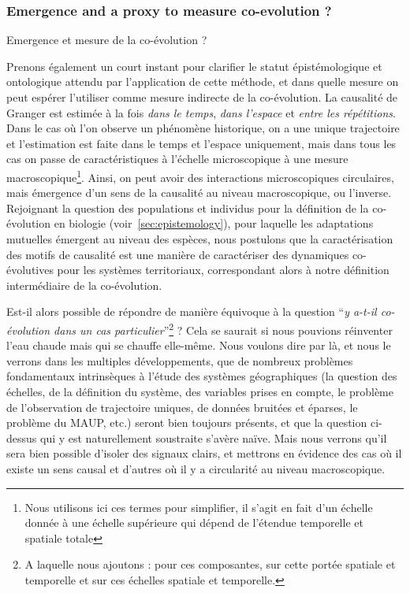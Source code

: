 \subsubsection{Emergence and a proxy to measure co-evolution ?}{Emergence et mesure de la co-évolution ?}



Prenons également un court instant pour clarifier le statut épistémologique et ontologique attendu par l'application de cette méthode, et dans quelle mesure on peut espérer l'utiliser comme mesure indirecte de la co-évolution. La causalité de Granger est estimée à la fois \emph{dans le temps}, \emph{dans l'espace} et \emph{entre les répétitions}. Dans le cas où l'on observe un phénomène historique, on a une unique trajectoire et l'estimation est faite dans le temps et l'espace uniquement, mais dans tous les cas on passe de caractéristiques à l'échelle microscopique à une mesure macroscopique\footnote{Nous utilisons ici ces termes pour simplifier, il s'agit en fait d'un échelle donnée à une échelle supérieure qui dépend de l'étendue temporelle et spatiale totale}. Ainsi, on peut avoir des interactions microscopiques circulaires, mais émergence d'un sens de la causalité au niveau macroscopique, ou l'inverse. Rejoignant la question des populations et individus pour la définition de la co-évolution en biologie (voir~\ref{sec:epistemology}), pour laquelle les adaptations mutuelles émergent au niveau des espèces, nous postulons que la caractérisation des motifs de causalité est une manière de caractériser des dynamiques co-évolutives pour les systèmes territoriaux, correspondant alors à notre définition intermédiaire de la co-évolution.


Est-il alors possible de répondre de manière équivoque à la question ``\textit{y a-t-il co-évolution dans un cas particulier}''\footnote{A laquelle nous ajoutons : pour ces composantes, sur cette portée spatiale et temporelle et sur ces échelles spatiale et temporelle.} ? Cela se saurait si nous pouvions réinventer l'eau chaude mais qui se chauffe elle-même. Nous voulons dire par là, et nous le verrons dans les multiples développements, que de nombreux problèmes fondamentaux intrinsèques à l'étude des systèmes géographiques (la question des échelles, de la définition du système, des variables prises en compte, le problème de l'observation de trajectoire uniques, de données bruitées et éparses, le problème du MAUP, etc.) seront bien toujours présents, et que la question ci-dessus qui y est naturellement soustraite s'avère naïve. Mais nous verrons qu'il sera bien possible d'isoler des signaux clairs, et mettrons en évidence des cas où il existe un sens causal et d'autres où il y a circularité au niveau macroscopique.

